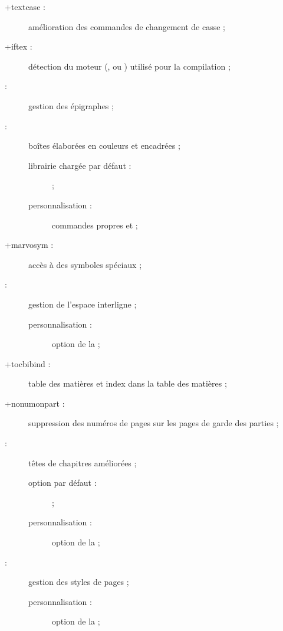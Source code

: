 \begin{description}
\item[\package*+{textcase} :] amélioration des commandes de changement de
  casse ;
\item[\package+{iftex} :] détection du moteur (, 
  ou ) utilisé pour la compilation ;
\item[ :] gestion des épigraphes ;
\item[ :] boîtes élaborées en couleurs et encadrées ;
  \begin{description}
  \item[librairie chargée par défaut :]  ;
  \item[personnalisation :] commandes propres  et
     ;
  \end{description}
\item[\package+{marvosym} :] accès à des symboles spéciaux ;
\item[ :] gestion de l'espace
  interligne ;
  \begin{description}
  \item[personnalisation :] option  de la \yatCl ;
  \end{description}
\item[\package*+{tocbibind} :] table des matières et index dans la table des
  matières ;
\item[\package*+{nonumonpart} :] suppression des numéros de pages sur les pages
  de garde des parties ;
\item[ :] %
  têtes de chapitres améliorées ;
  \begin{description}
  \item[option par défaut :]  ;
  \item[personnalisation :] option  de la \yatCl ;
  \end{description}
\item[ :] %
  gestion des styles de pages ;
  \begin{description}
  \item[personnalisation :] option  de la \yatCl ;
  \end{description}

\end{description}
